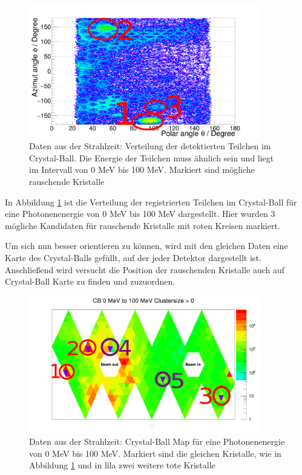 \documentclass[a4paper,11pt,oneside,final,german,openbib,pdftex]{scrbook}
\begin{document}
{\begin{figure}[h!]
	\begin{center}
		\includegraphics[width=100mm]{NewCalib/Strahlzeit2014/ClusterSize/20172104StrahlzeitClusterSize0Marker}
	\end{center}
	\caption[Strahlzeit: Markierte rauschende Kristalle; Niedrige Energien]{Daten aus der Strahlzeit: Verteilung der detektierten Teilchen im Crystal-Ball. Die Energie der Teilchen muss \"ahnlich sein und liegt im Intervall von 0 MeV bis 100 MeV. Markiert sind m\"ogliche rauschende Kristalle}
	\label{fig:Markierte-Hot-Crystals}
\end{figure}

In Abbildung \ref{fig:Markierte-Hot-Crystals} ist die Verteilung der registrierten Teilchen im Crystal-Ball f\"ur eine Photonenenergie von 0 MeV bis 100 MeV dargestellt. Hier wurden 3 m\"ogliche Kandidaten f\"ur rauschende Kristalle mit roten Kreisen markiert. 


Um sich nun besser orientieren zu k\"onnen, wird mit den gleichen Daten eine Karte des Crystal-Balls gef\"ullt, auf der jeder Detektor dargestellt ist.
Anschlie{\ss}end wird versucht die Position der rauschenden Kristalle auch auf Crystal-Ball Karte zu finden und zuzuordnen.




\begin{figure}[h!]
	\begin{center}
		\includegraphics[width=100mm]{NewCalib/Strahlzeit2014/ClusterSizeNew/20172404Clustersize0Map100MeV}
		\caption[Strahlzeit: Markierte defekte Kristalle auf der CB-Karte; Niedrige Energien]{Daten aus der Strahlzeit: Crystal-Ball Map f\"ur eine Photonenenergie von 0 MeV bis 100 MeV. Markiert sind die gleichen Kristalle, wie in Abbildung \ref{fig:Markierte-Hot-Crystals} und in lila zwei weitere tote Kristalle}
		\label{fig:Makierte-Kristalle-Map}
	\end{center}
\end{figure}

}
\end{document}
